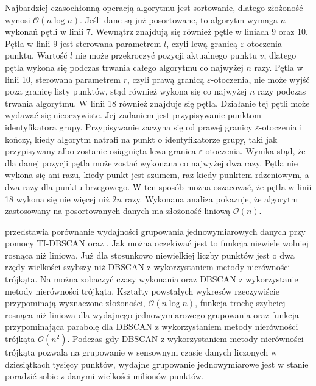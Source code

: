 Najbardziej czasochłonną operacją algorytmu jest sortowanie, dlatego złożoność wynosi $ \mathcal{O}(n\log{}n) $. Jeśli dane są już posortowane, to algorytm wymaga $ n $ wykonań pętli w linii 7. Wewnątrz znajdują się również pętle w liniach 9 oraz 10. Pętla w linii 9 jest sterowana parametrem $ l $, czyli lewą granicą $ \varepsilon $-otoczenia punktu. Wartość $ l $ nie może przekroczyć pozycji aktualnego punktu $ v $, dlatego pętla wykona się podczas trwania całego algorytmu co najwyżej $ n $ razy. Pętla w linii 10, sterowana parametrem $ r $, czyli prawą granicą $ \varepsilon $-otoczenia, nie może wyjść poza granicę listy punktów, stąd również wykona się co najwyżej $ n $ razy podczas trwania algorytmu. W linii 18 również znajduje się pętla. Działanie tej pętli może wydawać się nieoczywiste. Jej zadaniem jest przypisywanie punktom identyfikatora grupy. Przypisywanie zaczyna się od prawej granicy $ \varepsilon $-otoczenia i kończy, kiedy algorytm natrafi na punkt o identyfikatorze grupy, taki jak przypisywany albo zostanie osiągnięta lewa granica $ \varepsilon $-otoczenia. Wynika stąd, że dla danej pozycji pętla może zostać wykonana co najwyżej dwa razy. Pętla nie wykona się ani razu, kiedy punkt jest szumem, raz kiedy punktem rdzeniowym, a dwa razy dla punktu brzegowego. W ten sposób można oszacować, że pętla w linii 18 wykona się nie więcej niż $ 2n $ razy. Wykonana analiza pokazuje, że algorytm zastosowany na posortowanych danych ma złożoność liniową $ \mathcal{O}(n). $\par



 przedstawia porównanie wydajności grupowania jednowymiarowych danych przy pomocy TI-DBSCAN oraz . Jak można oczekiwać jest to funkcja niewiele wolniej rosnąca niż liniowa. Już dla stosunkowo niewielkiej liczby punktów  jest o dwa rzędy wielkości szybszy niż DBSCAN z wykorzystaniem metody nierówności trójkąta. Na  można zobaczyć czasy wykonania  oraz DBSCAN z wykorzystanie metody nierówności trójkąta. Kształty powstałych wykresów rzeczywiście przypominają wyznaczone złożoności, $ \mathcal{O}(n\log{}n) $, funkcja trochę szybciej rosnąca niż liniowa dla wydajnego jednowymiarowego grupowania oraz funkcja przypominająca parabolę dla DBSCAN z wykorzystaniem metody nierówności trójkąta $ \mathcal{O}(n^2) $. Podczas gdy DBSCAN z wykorzystaniem metody nierówności trójkąta pozwala na grupowanie w sensownym czasie danych liczonych w dziesiątkach tysięcy punktów, wydajne grupowanie jednowymiarowe jest w stanie poradzić sobie z danymi wielkości milionów punktów.\par

